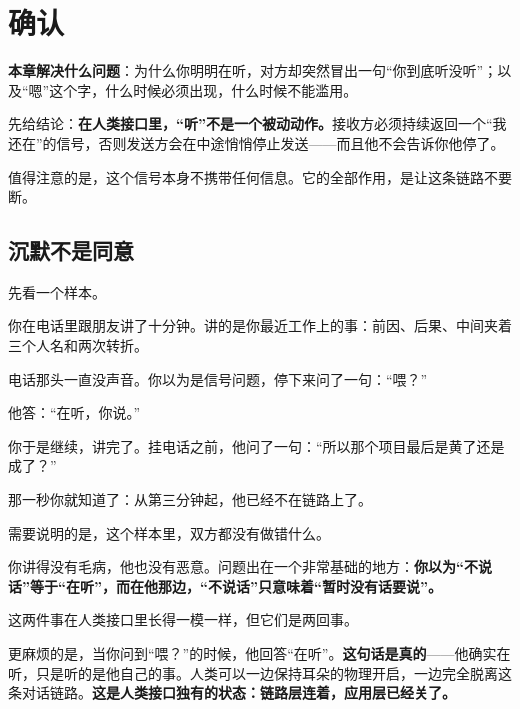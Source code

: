 \chapter{确认}


\begin{guideblock}
\textbf{本章解决什么问题}：为什么你明明在听，对方却突然冒出一句“你到底听没听”；以及“嗯”这个字，什么时候必须出现，什么时候不能滥用。
\end{guideblock}

先给结论：\textbf{在人类接口里，“听”不是一个被动动作。}接收方必须持续返回一个“我还在”的信号，否则发送方会在中途悄悄停止发送——而且他不会告诉你他停了。

值得注意的是，这个信号本身不携带任何信息。它的全部作用，是让这条链路不要断。

\hcirule

\section{沉默不是同意}

先看一个样本。

\par
\begin{mdquote}
你在电话里跟朋友讲了十分钟。讲的是你最近工作上的事：前因、后果、中间夹着三个人名和两次转折。

电话那头一直没声音。你以为是信号问题，停下来问了一句：“喂？”

他答：“在听，你说。”

你于是继续，讲完了。挂电话之前，他问了一句：“所以那个项目最后是黄了还是成了？”

那一秒你就知道了：从第三分钟起，他已经不在链路上了。
\end{mdquote}

需要说明的是，这个样本里，双方都没有做错什么。

你讲得没有毛病，他也没有恶意。问题出在一个非常基础的地方：\textbf{你以为“不说话”等于“在听”，而在他那边，“不说话”只意味着“暂时没有话要说”。}

这两件事在人类接口里长得一模一样，但它们是两回事。

更麻烦的是，当你问到“喂？”的时候，他回答“在听”。\textbf{这句话是真的}——他确实在听，只是听的是他自己的事。人类可以一边保持耳朵的物理开启，一边完全脱离这条对话链路。\textbf{这是人类接口独有的状态：链路层连着，应用层已经关了。}

